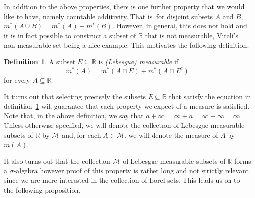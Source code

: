 \documentclass[a4paper,11pt]{article}
\theoremstyle{plain}
\theoremstyle{definition}
\newtheorem{definition}[theorem]{Definition}
\begin{document}
In addition to the above properties, there is one further property that we would like to have, namely countable additivity. That is, for disjoint subsets $A$ and $B$, $m^*(A \cup B) = m^*(A) + m^*(B)$. However, in general, this does not hold and it is in fact possible to construct a subset of $\mathbb{R}$ that is not measurable, Vitali's non-measurable set \citep[\S~1]{AK} being a nice example. This motivates the following definition.



\begin{definition} \citep[p.~27]{MC}\label{Lebmeas}
A subset $E \subseteq \mathbb{R}$ is \textit{(Lebesgue) measurable} if
\[
m^*(A) = m^*(A \cap E) + m^*(A \cap E^c)
\]
for every $A \subseteq \mathbb{R}$.
\end{definition}

It turns out that selecting precisely the subsets $E \subseteq \mathbb{R}$ that satisfy the equation in definition~\ref{Lebmeas} will guarantee that each property we expect of a measure is satisfied. Note that, in the above definition, we say that $a + \infty = \infty + a = \infty + \infty = \infty$. Unless otherwise specified, we will denote the collection of Lebesgue measurable subsets of $\mathbb{R}$ by $\mathcal{M}$ and, for each $A \in \mathcal{M}$, we will denote the measure of $A$ by $m(A)$.

It also turns out that the collection $\mathcal{M}$ of Lebesgue measurable subsets of $\mathbb{R}$ forms a $\sigma$-algebra \citep[p.~29-34]{MC} however proof of this property  is rather long and not strictly relevant since we are more interested in the collection of Borel sets. This leads us on to the following proposition.
\end{document}
